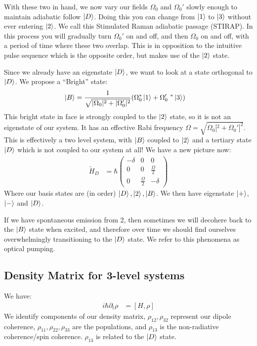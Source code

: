 With these two in hand, we now vary our fields $\Omega_0$ and $\Omega_0'$ slowly enough to maintain adiabatic follow $\ket{D}$. Doing this you can change from $\ket{1}$ to $\ket{3}$ without ever entering $\ket{2}$.
We call this Stimulated Raman adiabatic passage (STIRAP). In this process you will gradually turn $\Omega_0'$ on and off, and then $\Omega_0$ on and off, with a period of time where these two overlap.
This is in opposition to the intuitive pulse sequence which is the opposite order, but makes use of the $\ket{2}$ state.

Since we already have an eigenstate $\ket{D}$, we want to look at a state orthogonal to $\ket{D}$. We propose a ``Bright'' state:
\begin{align*}
	\ket{B} &= \frac{1}{\sqrt{|\Omega_0|^2 + |\Omega_0'|^2}} (\Omega_0^*\ket{1} + \Omega_0'\ ^*\ket{3})
\end{align*}
This bright state in face is strongly coupled to the $\ket{2}$ state, so it is not an eigenstate of our system. It has an effective Rabi frequency $\Omega = \sqrt{\Omega_0|^2 + \Omega_0'|^2}$.
This is effectively a two level system, with $\ket{B}$ coupled to $\ket{2}$ and a tertiary state $\ket{D}$ which is not coupled to our system at all! We have a new picture now:
\begin{align*}
	\tilde{H}_D &= \hbar \begin{pmatrix}
		-\delta & 0 & 0 \\
		0 & 0 & \frac{\Omega}{2} \\
		0 & \frac{\Omega}{2} & -\delta
			     \end{pmatrix}
\end{align*}
Where our basis states are (in order) $\ket{D},\ket{2},\ket{B}$. We then have eigenstate $\ket{+}$, $\ket{-}$ and $\ket{D}$.

If we have spontaneous emission from 2, then sometimes we will decohere back to the $\ket{B}$ state when excited, and therefore over time we should find ourselves overwhelmingly transitioning to the $\ket{D}$ state.
We refer to this phenomena as optical pumping.
\subsection{Density Matrix for 3-level systems}
We have:
\begin{align*}
	i\hbar \partial_t \rho  &= [H,\rho]
\end{align*}
We identify components of our density matrix, $\rho_{12},\rho_{32}$ represent our dipole coherence, $\rho_{11},\rho_{22},\rho_{33}$ are the populations, and $\rho_{13}$ is the non-radiative coherence/spin coherence. $\rho_{13}$ is related to the $\ket{D}$ state.
